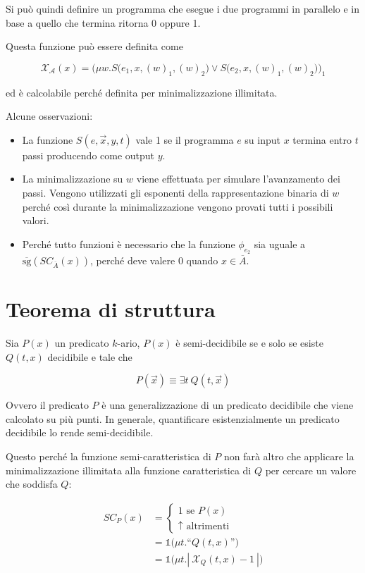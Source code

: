 Si può quindi definire un programma che esegue i due programmi in parallelo e in base a quello che termina ritorna 0 oppure 1.

Questa funzione può essere definita come 

$$
\mathcal{X_A}(x) = \Bigg( \mu w . S\bigg( e_1, x, (w)_1, (w)_2\bigg)  \vee S\bigg( e_2, x, (w)_1, (w)_2\bigg)  \Bigg)_1
$$

ed è calcolabile perché definita per minimalizzazione illimitata.

Alcune osservazioni:

\begin{itemize}
	\item La funzione $S(e, \vec{x}, y, t)$ vale 1 se il programma $e$ su input $x$ termina entro $t$ passi producendo come output $y$.
	\item La minimalizzazione su $w$ viene effettuata per simulare l'avanzamento dei passi. Vengono utilizzati gli esponenti della rappresentazione binaria di $w$ perché così durante la minimalizzazione vengono provati tutti i possibili valori.
	\item Perché tutto funzioni è necessario che la funzione $\phi_{e_2}$ sia uguale a $\overline{\text{sg}} (SC_{\overline{A}} (x))$, perché deve valere 0 quando $x \in \overline{A}$.
\end{itemize}

\section{Teorema di struttura}

Sia $P(x)$ un predicato $k$-ario, $P(x)$ è semi-decidibile se e solo se esiste $Q(t,x)$ decidibile e tale che

$$
P(\vec{x}) \equiv \exists t \: Q(t,\vec{x})
$$

Ovvero il predicato $P$ è una generalizzazione di un predicato decidibile che viene calcolato su più punti. In generale, quantificare esistenzialmente un predicato decidibile lo rende semi-decidibile.

Questo perché la funzione semi-caratteristica di $P$ non farà altro che applicare la minimalizzazione illimitata alla funzione caratteristica di $Q$ per cercare un valore che soddisfa $Q$:

\begin{align*}
	SC_P(x) &= \begin{cases}
		1 \text{ se } P(x)\\
		\uparrow \text{ altrimenti}
	\end{cases} \\
	&= \mathbb{1} \bigg( \mu t. \text{``} Q(t,x)\text{''} \bigg) \\
	&= \mathbb{1} \bigg( \mu t. | \: \mathcal{X}_Q(t,x) - 1 \: | \bigg)
\end{align*}

